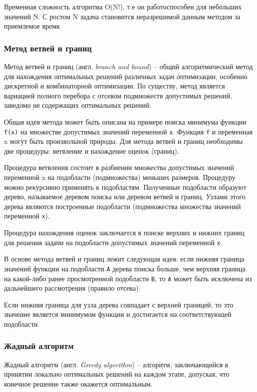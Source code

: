 \documentclass[14pt,a4paper]{extarticle}
\begin{document}
		Временная сложность алгоритма O(N!), т.е он работоспособен для небольших значений N. С ростом N задача становится неразрешимой данным методом за приемлемое время.
	
	\subsubsection{Метод ветвей и границ}
	
		Метод ветвей и границ (англ. \emph{branch and bound}) -- общий алгоритмический метод для нахождения оптимальных решений различных задач оптимизации, особенно дискретной и комбинаторной оптимизации. По существу, метод является вариацией полного перебора с отсевом подмножеств допустимых решений, заведомо не содержащих оптимальных решений.

		Общая идея метода может быть описана на примере поиска минимума функции \texttt{f(x)} на множестве допустимых значений переменной \texttt{x}. Функция \texttt{f} и переменная x могут быть произвольной природы. Для метода ветвей и границ необходимы две процедуры: ветвление и нахождение оценок (границ).

		Процедура ветвления состоит в разбиении множества допустимых значений переменной x на подобласти (подмножества) меньших размеров. Процедуру можно рекурсивно применять к подобластям. Полученные подобласти образуют дерево, называемое деревом поиска или деревом ветвей и границ. Узлами этого дерева являются построенные подобласти (подмножества множества значений переменной \texttt{x}).

		Процедура нахождения оценок заключается в поиске верхних и нижних границ для решения задачи на подобласти допустимых значений переменной \texttt{x}.

		В основе метода ветвей и границ лежит следующая идея: если нижняя граница значений функции на подобласти \texttt{A} дерева поиска больше, чем верхняя граница на какой-либо ранее просмотренной подобласти \texttt{B}, то \texttt{A} может быть исключена из дальнейшего рассмотрения (правило отсева).

		Если нижняя граница для узла дерева совпадает с верхней границей, то это значение является минимумом функции и достигается на соответствующей подобласти.


	\subsubsection{Жадный алгоритм}
	
	Жадный алгоритм (англ. \emph{Greedy algorithm}) -- алгоритм, заключающийся в принятии локально оптимальных решений на каждом этапе, допуская, что конечное решение также окажется оптимальным.
	
\end{document}
